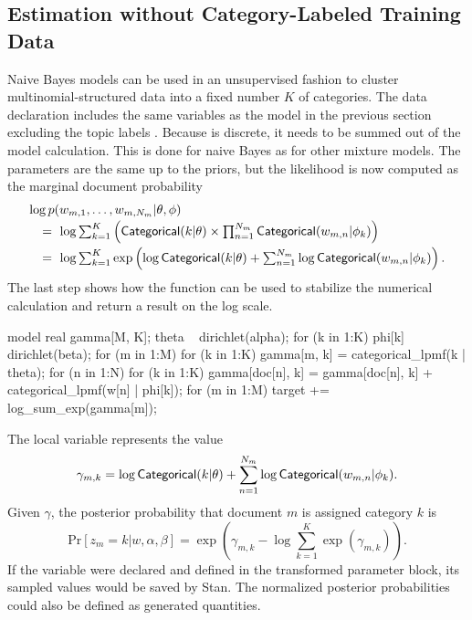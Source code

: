 \subsection{Estimation without Category-Labeled Training Data}

Naive Bayes models can be used in an unsupervised fashion to cluster
multinomial-structured data into a fixed number $K$ of categories.
The data declaration includes the same variables as the model in the
previous section excluding the topic labels .   Because
 is discrete, it needs to be summed out of the model
calculation.  This is done for naive Bayes as for other mixture
models.  The parameters are the same up to the priors, but the
likelihood is now computed as the marginal document probability
\[
\begin{array}{l}
\log p(w_{m,1},\ldots,w_{m,N_m}|\theta,\phi)
\\[2pt]
\ \ \ = \
\log \sum_{k=1}^K
\left( \mbox{\sf Categorical}(k|\theta)
        \times \prod_{n=1}^{N_m} \mbox{\sf Categorical}(w_{m,n}|\phi_k)
\right)
\\[6pt]
\ \ \ = \
\log \sum_{k=1}^K \exp \left(
\log \mbox{\sf Categorical}(k|\theta)
+ \sum_{n=1}^{N_m} \log \mbox{\sf Categorical}(w_{m,n}|\phi_k)
\right).
\end{array}
\]
%
The last step shows how the  function can be used
to stabilize the numerical calculation and return a result on the log
scale.
%
\begin{stancode}
model {
  real gamma[M, K];
  theta ~ dirichlet(alpha);
  for (k in 1:K)
    phi[k] ~ dirichlet(beta);
  for (m in 1:M)
    for (k in 1:K)
      gamma[m, k] = categorical_lpmf(k | theta);
  for (n in 1:N)
    for (k in 1:K)
      gamma[doc[n], k] = gamma[doc[n], k]
                         + categorical_lpmf(w[n] | phi[k]);
  for (m in 1:M)
    target += log_sum_exp(gamma[m]);
}
\end{stancode}
%
The local variable  represents the value
\[
\gamma_{m,k} = \log \mbox{\sf Categorical}(k|\theta)
+ \sum_{n=1}^{N_m} \log \mbox{\sf Categorical}(w_{m,n}|\phi_k).
\]
%
Given $\gamma$, the posterior probability that document
$m$ is assigned category $k$ is
\[
\mbox{Pr}[z_m = k|w,\alpha,\beta]
=
\exp \left(
\gamma_{m,k}
- \log \sum_{k=1}^K \exp \left( \gamma_{m,k} \right)
\right).
\]
%
If the variable  were declared and defined in the
transformed parameter block, its sampled values would be saved by
Stan.  The normalized posterior probabilities could also be defined as
generated quantities.

